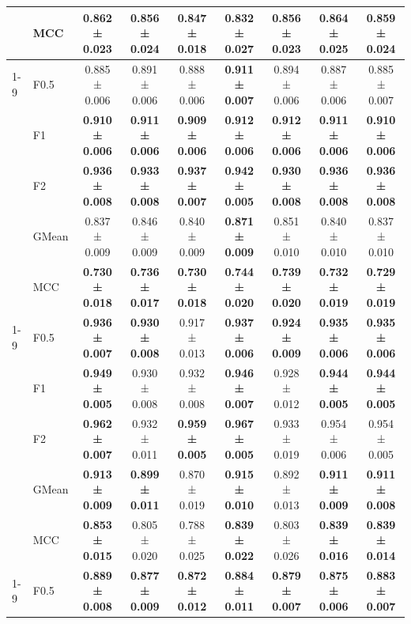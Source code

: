 \begin{table}[H]
{\begin{tabular}{llccccccc}
 & MCC & \textbf{0.862 ± 0.023} & \textbf{0.856 ± 0.024} & \textbf{0.847 ± 0.018} & \textbf{0.832 ± 0.027} & \textbf{0.856 ± 0.023} & \textbf{0.864 ± 0.025} & \textbf{0.859 ± 0.024} \\
\cline{1-9}
\multirow[t]{5}{*}{GaussianNB} & F0.5 & 0.885 ± 0.006 & 0.891 ± 0.006 & 0.888 ± 0.006 & \textbf{0.911 ± 0.007} & 0.894 ± 0.006 & 0.887 ± 0.006 & 0.885 ± 0.007 \\
 & F1 & \textbf{0.910 ± 0.006} & \textbf{0.911 ± 0.006} & \textbf{0.909 ± 0.006} & \textbf{0.912 ± 0.006} & \textbf{0.912 ± 0.006} & \textbf{0.911 ± 0.006} & \textbf{0.910 ± 0.006} \\
 & F2 & \textbf{0.936 ± 0.008} & \textbf{0.933 ± 0.008} & \textbf{0.937 ± 0.007} & \textbf{0.942 ± 0.005} & \textbf{0.930 ± 0.008} & \textbf{0.936 ± 0.008} & \textbf{0.936 ± 0.008} \\
 & GMean & 0.837 ± 0.009 & 0.846 ± 0.009 & 0.840 ± 0.009 & \textbf{0.871 ± 0.009} & 0.851 ± 0.010 & 0.840 ± 0.010 & 0.837 ± 0.010 \\
 & MCC & \textbf{0.730 ± 0.018} & \textbf{0.736 ± 0.017} & \textbf{0.730 ± 0.018} & \textbf{0.744 ± 0.020} & \textbf{0.739 ± 0.020} & \textbf{0.732 ± 0.019} & \textbf{0.729 ± 0.019} \\
\cline{1-9}
\multirow[t]{5}{*}{LGBM()} & F0.5 & \textbf{0.936 ± 0.007} & \textbf{0.930 ± 0.008} & 0.917 ± 0.013 & \textbf{0.937 ± 0.006} & \textbf{0.924 ± 0.009} & \textbf{0.935 ± 0.006} & \textbf{0.935 ± 0.006} \\
 & F1 & \textbf{0.949 ± 0.005} & 0.930 ± 0.008 & 0.932 ± 0.008 & \textbf{0.946 ± 0.007} & 0.928 ± 0.012 & \textbf{0.944 ± 0.005} & \textbf{0.944 ± 0.005} \\
 & F2 & \textbf{0.962 ± 0.007} & 0.932 ± 0.011 & \textbf{0.959 ± 0.005} & \textbf{0.967 ± 0.005} & 0.933 ± 0.019 & 0.954 ± 0.006 & 0.954 ± 0.005 \\
 & GMean & \textbf{0.913 ± 0.009} & \textbf{0.899 ± 0.011} & 0.870 ± 0.019 & \textbf{0.915 ± 0.010} & 0.892 ± 0.013 & \textbf{0.911 ± 0.009} & \textbf{0.911 ± 0.008} \\
 & MCC & \textbf{0.853 ± 0.015} & 0.805 ± 0.020 & 0.788 ± 0.025 & \textbf{0.839 ± 0.022} & 0.803 ± 0.026 & \textbf{0.839 ± 0.016} & \textbf{0.839 ± 0.014} \\
\cline{1-9}
\multirow[t]{5}{*}{LogisticRegression()} & F0.5 & \textbf{0.889 ± 0.008} & \textbf{0.877 ± 0.009} & \textbf{0.872 ± 0.012} & \textbf{0.884 ± 0.011} & \textbf{0.879 ± 0.007} & \textbf{0.875 ± 0.006} & \textbf{0.883 ± 0.007} \\

\end{tabular}}
\end{table}
